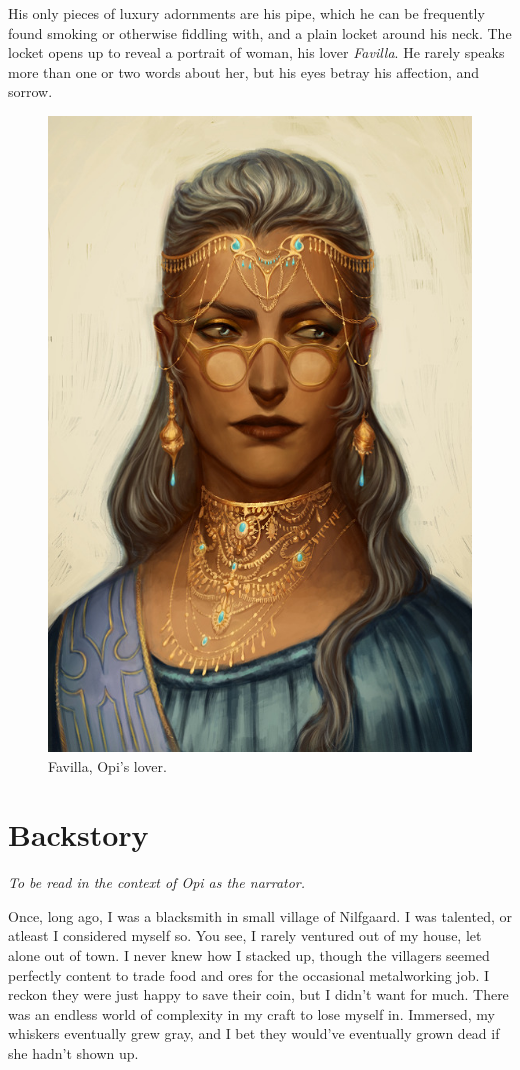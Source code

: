 \documentclass[12pt]{article}
\begin{document}
His only pieces of luxury adornments are his pipe, which he can be frequently found smoking or
otherwise fiddling with, and a plain locket around his neck. The locket opens up to reveal
a portrait of woman, his lover {\it Favilla}. He rarely speaks more than one or two words about her,
but his eyes betray his affection, and sorrow.

\begin{figure}[H]
  \centering
  \includegraphics[width=.55\textwidth]{./resources/Favilla}
  \caption{
    Favilla, Opi's lover.
  }
\end{figure}

\section{Backstory}

{\it To be read in the context of Opi as the narrator.}

\noindent
Once, long ago, I was a blacksmith in small village of Nilfgaard. I was talented, or atleast
I considered myself so. You see, I rarely ventured out of my house, let alone out of town. I never
knew how I stacked up, though the villagers seemed perfectly content to trade food and ores for the
occasional metalworking job. I reckon they were just happy to save their coin, but I didn't want for
much. There was an endless world of complexity in my craft to lose myself in. Immersed, my whiskers
eventually grew gray, and I bet they would've eventually grown dead if she hadn't shown up.
\end{document}

